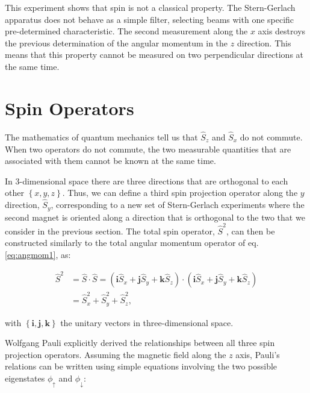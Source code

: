 \documentclass[
  9pt,
]{extbook}
\theoremstyle{definition}
\theoremstyle{definition}
\theoremstyle{definition}
\theoremstyle{remark}
\begin{document}
This experiment shows that spin is not a classical property. The Stern-Gerlach apparatus does not behave as a simple filter, selecting beams with one specific pre-determined characteristic. The second measurement along the \(x\) axis destroys the previous determination of the angular momentum in the \(z\) direction. This means that this property cannot be measured on two perpendicular directions at the same time.

\hypertarget{spin-operators}{%
\section{Spin Operators}\label{spin-operators}}

The mathematics of quantum mechanics tell us that \(\hat{S}_z\) and \(\hat{S}_x\) do not commute. When two operators do not commute, the two measurable quantities that are associated with them cannot be known at the same time.

In 3-dimensional space there are three directions that are orthogonal to each other \(\left\{x,y,z\right\}\). Thus, we can define a third spin projection operator along the \(y\) direction, \(\hat{S}_y\), corresponding to a new set of Stern-Gerlach experiments where the second magnet is oriented along a direction that is orthogonal to the two that we consider in the previous section. The total spin operator, \(\hat{S}^2\), can then be constructed similarly to the total angular momentum operator of eq. \eqref{eq:angmom1}, as:

\begin{equation}
\begin{aligned}
\hat{S}^2 &=\hat{S}\cdot\hat{S}=\left(\mathbf{i}\hat{S}_x+\mathbf{j}\hat{S}_y+\mathbf{k}\hat{S}_z\right)\cdot\left(\mathbf{i}\hat{S}_x+\mathbf{j}\hat{S}_y+\mathbf{k}\hat{S}_z \right) \\
&=\hat{S}_x^2+\hat{S}_y^2+\hat{S}_z^2,
\end{aligned}
\label{eq:spop1}    
\end{equation}

with \(\left\{\mathbf{i},\mathbf{j},\mathbf{k}\right\}\) the unitary vectors in three-dimensional space.

Wolfgang Pauli explicitly derived the relationships between all three spin projection operators. Assuming the magnetic ﬁeld along the \(z\) axis, Pauli's relations can be written using simple equations involving the two possible eigenstates \(\phi_{\uparrow}\) and \(\phi_{\downarrow}\):
\end{document}
